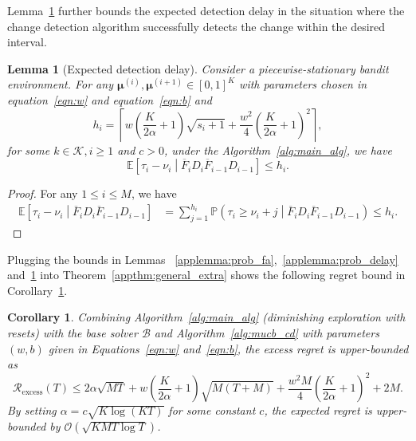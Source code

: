 \documentclass[twoside]{article}
\def\eqref#1{equation~\ref{#1}}
\def\Algref#1{Algorithm~\ref{#1}}
\def\gK{{\mathcal{K}}}
\newcommand{\E}{\mathbb{E}}
\theoremstyle{plain}
\newtheorem{lemma}[theorem]{Lemma}
\newtheorem{corollary}[theorem]{Corollary}
\theoremstyle{definition}
\theoremstyle{remark}
\def\Rex{\mathcal{R}_{\mathrm{excess}}}
\begin{document}
Lemma~\ref{applemma:exp_delay} further bounds the expected detection delay in the situation where the change detection algorithm successfully detects the change within the desired interval.

\begin{lemma}[Expected detection delay]\label{applemma:exp_delay} 
Consider a piecewise-stationary bandit environment. For any $\boldsymbol{\mu}^{(i)},\boldsymbol{\mu}^{(i+1)}\in\left[0,1\right]^{K}$ with parameters chosen in \eqref{eqn:w} and \eqref{eqn:b} 
and
\begin{equation}
h_{i} = \left\lceil w\left(\frac{K}{2\alpha}+1\right)\sqrt{s_{i}+1}+\frac{w^{2}}{4}\left(\frac{K}{2\alpha}+1\right)^{2} \right\rceil,
\end{equation}
for some $k\in\gK, i\geq 1$ and $c>0$, under the \Algref{alg:main_alg}, we have
\begin{equation}
    \E\left[\tau_{i}-\nu_{i}\middle| \overline{F}_{i}D_{i}\overline{F}_{i-1}D_{i-1}\right]\leq h_{i}.
\end{equation}
\end{lemma}


\begin{proof}
    For any $1\leq i\leq M$, we have
    \begin{subequations}
        \begin{align}
            \E\left[\tau_{i}-\nu_{i}\middle| \overline{F}_{i}D_{i}\overline{F}_{i-1}D_{i-1}\right]  
            &=\sum^{h_{i}}_{j=1}\mathbb{P}\left(\tau_{i}\geq\nu_{i}+j\middle| \overline{F}_{i}D_{i}\overline{F}_{i-1}D_{i-1}\right)
            \leq h_{i}.
        \end{align}
    \end{subequations}
\end{proof}

Plugging the bounds in Lemmas ~\ref{applemma:prob_fa},~\ref{applemma:prob_delay} and~\ref{applemma:exp_delay} into Theorem~\ref{appthm:general_extra} shows the following regret bound in Corollary~\ref{appcor:onestate_ucb_mucb}.

\begin{corollary}\label{appcor:onestate_ucb_mucb}
Combining Algorithm~\ref{alg:main_alg} (diminishing exploration with resets) 
with the base solver $\mathcal{B}$ and Algorithm~\ref{alg:mucb_cd} with parameters $(w,b)$ given in Equations~\ref{eqn:w} and~\ref{eqn:b}, 
the excess regret is upper-bounded as
\begin{equation}
     \Rex(T)\leq 2\alpha\sqrt{MT}+w\left(\frac{K}{2\alpha}+1\right)\sqrt{M\left(T+M\right)}+\frac{w^{2}M}{4}\left(\frac{K}{2\alpha}+1\right)^{2}+2M.
\end{equation}\label{eqn:regret_bound_MUCB_p}By setting $\alpha = c\sqrt{K\log{\left(KT\right)}}$ for some constant $c$, the expected regret is upper-bounded by $\mathcal{O}(\sqrt{KMT\log{T}})$.
\end{corollary}
\end{document}
